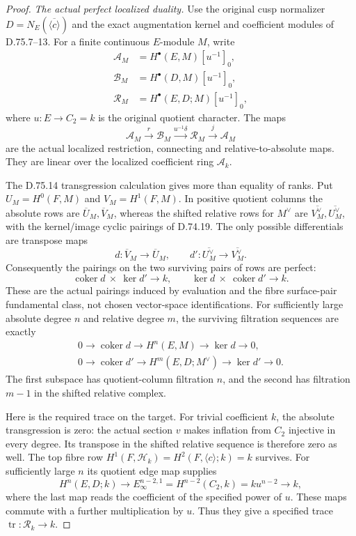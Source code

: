 \begin{proof}
\emph{The actual perfect localized duality.}
Use the original cusp normalizer $D=N_E(\overline{\langle c\rangle})$
and the exact augmentation kernel and coefficient modules of D.75.7--13.
For a finite continuous $E$-module $M$, write
\[
 \begin{aligned}
 \mathcal A_M&=H^\bullet(E,M)[u^{-1}]_0,\\
 \mathcal B_M&=H^\bullet(D,M)[u^{-1}]_0,\\
 \mathcal R_M&=H^\bullet(E,D;M)[u^{-1}]_0,
 \end{aligned}
\]
where $u:E\to C_2=k$ is the original quotient character. The maps
\[
 \mathcal A_M\xrightarrow{r}\mathcal B_M
       \xrightarrow{u^{-1}\delta}\mathcal R_M
       \xrightarrow{j}\mathcal A_M                         \tag{D.78.5}
\]
are the actual localized restriction, connecting and relative-to-absolute
maps. They are linear over the localized coefficient ring $\mathcal A_k$.

The D.75.14 transgression calculation gives more than equality of ranks.
Put $U_M=H^0(F,M)$ and $V_M=H^1(F,M)$. In positive quotient columns the
absolute rows are $\overline U_M,\overline V_M$, whereas the shifted
relative rows for $M^\vee$ are
$\overline{V_M^\vee},\overline{U_M^\vee}$, with the kernel/image cyclic
pairings of D.74.19. The only possible differentials are transpose maps
\[
 d:\overline V_M\to\overline U_M,
 \qquad d':\overline{U_M^\vee}\to\overline{V_M^\vee}.
\]
Consequently the pairings on the two surviving pairs of rows are perfect:
\[
 \operatorname{coker}d\ \times\ \ker d'\longrightarrow k,
 \qquad
 \ker d\ \times\ \operatorname{coker}d'\longrightarrow k.   \tag{D.78.6}
\]
These are the actual pairings induced by evaluation and the fibre
surface-pair fundamental class, not chosen vector-space identifications.
For sufficiently large absolute degree $n$ and relative degree $m$, the
surviving filtration sequences are exactly
\[
 \begin{gathered}
 0\longrightarrow\operatorname{coker}d\longrightarrow H^n(E,M)
      \longrightarrow\ker d\longrightarrow0,\\
 0\longrightarrow\operatorname{coker}d'\longrightarrow H^m(E,D;M^\vee)
      \longrightarrow\ker d'\longrightarrow0.
 \end{gathered}
\]
The first subspace has quotient-column filtration $n$, and the second
has filtration $m-1$ in the shifted relative complex.

Here is the required trace on the target. For trivial coefficient $k$,
the absolute transgression is zero: the actual section $v$ makes
inflation from $C_2$ injective in every degree. Its transpose in the
shifted relative sequence is therefore zero as well. The top fibre row
$H^1(F,\mathscr H_k)=H^2(F,\langle c\rangle;k)=k$ survives.
For sufficiently large $n$ its quotient edge map supplies
\[
 H^n(E,D;k)\longrightarrow
 E_\infty^{n-2,1}=H^{n-2}(C_2,k)=k u^{n-2}\longrightarrow k,
                                                               \tag{D.78.7}
\]
where the last map reads the coefficient of the specified power of $u$.
These maps commute with a further multiplication by $u$. Thus they give
a specified trace $\operatorname{tr}:\mathcal R_k\to k$.


\end{proof}
